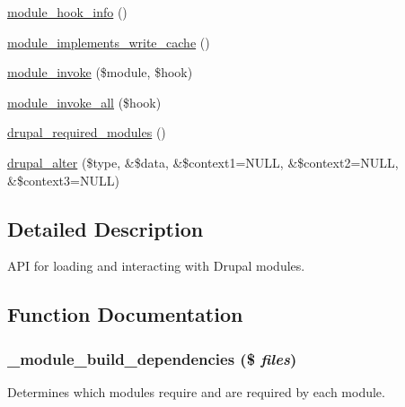 \begin{DoxyCompactItemize}
\hyperlink{group__hooks_ga30e72b1391cfa4c282fe98e0dabe02f9}{module\_\-hook\_\-info} ()
\item 
\hyperlink{group__hooks_ga993e46e78bf9dfb0e940c0dcccf5e33d}{module\_\-implements\_\-write\_\-cache} ()
\item 
\hyperlink{group__hooks_ga7547905cff161d057f9e71088ec67f05}{module\_\-invoke} (\$module, \$hook)
\item 
\hyperlink{group__hooks_gabedb5f566ef5faaa5768dd15125b111c}{module\_\-invoke\_\-all} (\$hook)
\item 
\hyperlink{module_8inc_a029be29693701bd21b6810e8d047c5a8}{drupal\_\-required\_\-modules} ()
\item 
\hyperlink{module_8inc_a0a8742a524bbb674b6c6a26755765007}{drupal\_\-alter} (\$type, \&\$data, \&\$context1=NULL, \&\$context2=NULL, \&\$context3=NULL)
\end{DoxyCompactItemize}


\subsection{Detailed Description}
API for loading and interacting with Drupal modules. 

\subsection{Function Documentation}
\hypertarget{module_8inc_a4a43fd8278bb4e660eff9a74aaba3dd4}{
\subsubsection[{\_\-module\_\-build\_\-dependencies}]{\setlength{\rightskip}{0pt plus 5cm}\_\-module\_\-build\_\-dependencies (\$ {\em files})}}
\label{module_8inc_a4a43fd8278bb4e660eff9a74aaba3dd4}
Determines which modules require and are required by each module.


